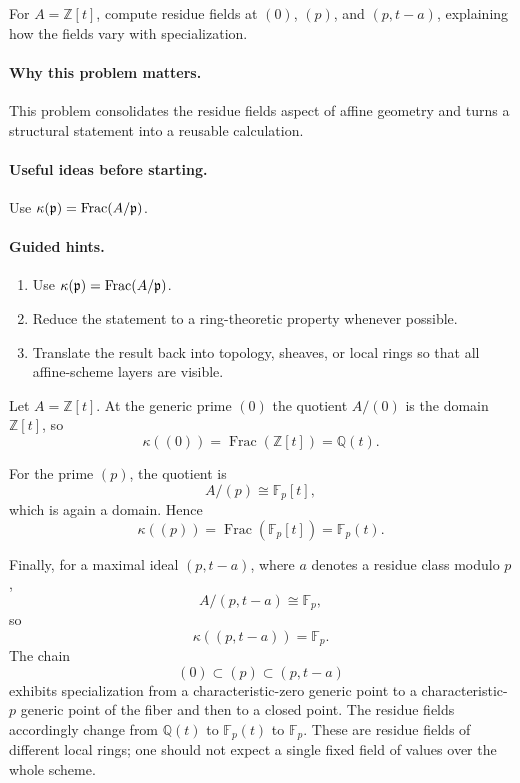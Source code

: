 \begin{problem}\label{prob:vi18-p16}
For $A=\mathbb Z[t]$, compute residue fields at $(0)$, $(p)$, and $(p,t-a)$, explaining how the fields vary with specialization.
\end{problem}

\ifdefined\FullProblemDossiers
\paragraph{Why this problem matters.}
This problem consolidates the residue fields aspect of affine geometry and turns a structural statement into a reusable calculation.

\paragraph{Useful ideas before starting.}
Use $\kappa(\mathfrak p)=\operatorname{Frac}(A/\mathfrak p)$.

\paragraph{Guided hints.}
\begin{enumerate}
\item Use $\kappa(\mathfrak p)=\operatorname{Frac}(A/\mathfrak p)$.
\item Reduce the statement to a ring-theoretic property whenever possible.
\item Translate the result back into topology, sheaves, or local rings so that all affine-scheme layers are visible.
\end{enumerate}

\begin{solution}
Let $A=\mathbb Z[t]$. At the generic prime $(0)$ the quotient $A/(0)$ is the domain $\mathbb Z[t]$, so
\[
\kappa((0))=\operatorname{Frac}(\mathbb Z[t])=\mathbb Q(t).
\]

For the prime $(p)$, the quotient is
\[
A/(p)\cong\mathbb F_p[t],
\]
which is again a domain. Hence
\[
\kappa((p))=\operatorname{Frac}(\mathbb F_p[t])=\mathbb F_p(t).
\]

Finally, for a maximal ideal $(p,t-a)$, where $a$ denotes a residue class modulo $p$,
\[
A/(p,t-a)\cong\mathbb F_p,
\]
so
\[
\kappa((p,t-a))=\mathbb F_p.
\]
The chain
\[
(0)\subset(p)\subset(p,t-a)
\]
exhibits specialization from a characteristic-zero generic point to a characteristic-$p$ generic point of the fiber and then to a closed point. The residue fields accordingly change from $\mathbb Q(t)$ to $\mathbb F_p(t)$ to $\mathbb F_p$. These are residue fields of different local rings; one should not expect a single fixed field of values over the whole scheme.
\end{solution}


